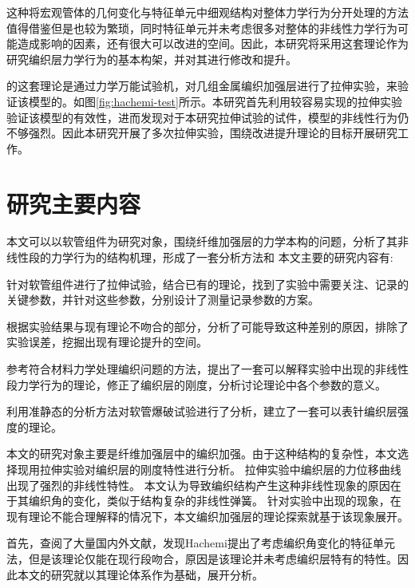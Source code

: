   这种将宏观管体的几何变化与特征单元中细观结构对整体力学行为分开处理的方法值得借鉴但是也较为繁琐，同时\ha 特征单元并未考虑很多对整体的非线性力学行为可能造成影响的因素，还有很大可以改进的空间。因此，本研究将采用这套理论作为研究编织层力学行为的基本构架，并对其进行修改和提升。
 
\citeauthor{Hachemi2011}的这套理论是通过力学万能试验机，对几组金属编织加强层进行了拉伸实验，来验证该模型的。如图\ref{fig:hachemi-test}所示。本研究首先利用较容易实现的拉伸实验验证该模型的有效性，进而发现对于本研究拉伸试验的试件，\ha 模型的非线性行为仍不够强烈。因此本研究开展了多次拉伸实验，围绕改进提升\ha 理论的目标开展研究工作。




 











\section{研究主要内容}
本文可以以软管组件为研究对象，围绕纤维加强层的力学本构的问题，分析了其非线性段的力学行为的结构机理，形成了一套分析方法和
本文主要的研究内容有:
\begin{asparaenum}
	\item 针对软管组件进行了拉伸试验，结合已有的理论，找到了实验中需要关注、记录的关键参数，并针对这些参数，分别设计了测量记录参数的方案。
	\item 根据实验结果与现有理论不吻合的部分，分析了可能导致这种差别的原因，排除了实验误差，挖掘出现有理论提升的空间。
	\item 参考符合材料力学处理编织问题的方法，提出了一套可以解释实验中出现的非线性段力学行为的理论，修正了编织层的刚度，分析讨论理论中各个参数的意义。
	 \item 
	利用准静态的分析方法对软管爆破试验进行了分析，建立了一套可以表针编织层强度的理论。
\end{asparaenum}

本文的研究对象主要是纤维加强层中的编织加强。由于这种结构的复杂性，本文选择现用拉伸实验对编织层的刚度特性进行分析。
拉伸实验中编织层的力位移曲线出现了强烈的非线性特性。
本文认为导致编织结构产生这种非线性现象的原因在于其编织角的变化，类似于结构复杂的非线性弹簧。
针对实验中出现的现象，在现有理论不能合理解释的情况下，本文编织加强层的理论探索就基于该现象展开。


首先，查阅了大量国内外文献，发现Hachemi提出了考虑编织角变化的特征单元法，但是该理论仅能在现行段吻合，原因是该理论并未考虑编织层特有的特性。因此本文的研究就以其理论体系作为基础，展开分析。

